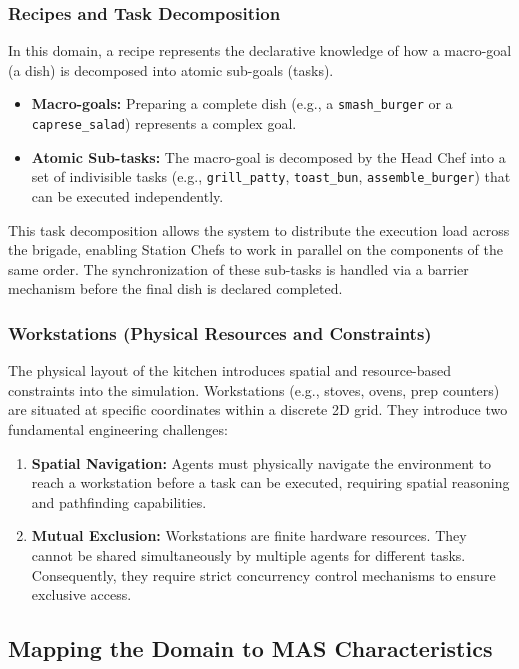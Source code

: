 \documentclass{scrartcl}
\begin{document}
\subsubsection{Recipes and Task Decomposition}
In this domain, a recipe represents the declarative knowledge of how a macro-goal (a dish) is decomposed into atomic sub-goals (tasks).

\begin{itemize}
\item \textbf{Macro-goals:} Preparing a complete dish (e.g., a \texttt{smash\_burger} or a \texttt{caprese\_salad}) represents a complex goal.
\item \textbf{Atomic Sub-tasks:} The macro-goal is decomposed by the Head Chef into a set of indivisible tasks (e.g., \texttt{grill\_patty}, \texttt{toast\_bun}, \texttt{assemble\_burger}) that can be executed independently.
\end{itemize}

This task decomposition allows the system to distribute the execution load across the brigade, enabling Station Chefs to work in parallel on the components of the same order. The synchronization of these sub-tasks is handled via a barrier mechanism before the final dish is declared completed.


\subsubsection{Workstations (Physical Resources and Constraints)}

The physical layout of the kitchen introduces spatial and resource-based constraints into the simulation. Workstations (e.g., stoves, ovens, prep counters) are situated at specific coordinates within a discrete 2D grid. They introduce two fundamental engineering challenges:
\begin{enumerate}
\item \textbf{Spatial Navigation:} Agents must physically navigate the environment to reach a workstation before a task can be executed, requiring spatial reasoning and pathfinding capabilities.
\item \textbf{Mutual Exclusion:} Workstations are finite hardware resources. They cannot be shared simultaneously by multiple agents for different tasks. Consequently, they require strict concurrency control mechanisms to ensure exclusive access.
\end{enumerate}


\subsection{Mapping the Domain to MAS Characteristics}
\end{document}

